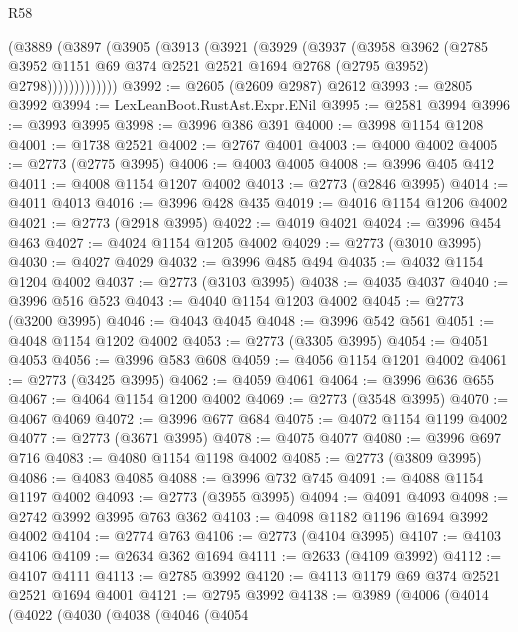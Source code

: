 \begin{lexlean}{R58}
\begin{coremodule}
            (@3889
              (@3897
                (@3905
                  (@3913
                    (@3921
                      (@3929
                        (@3937
                          (@3958
                            @3962
                            (@2785
                              @3952
                              @1151
                              @69
                              @374
                              @2521
                              @2521
                              @1694
                              @2768
                              (@2795 @3952)
                              @2798)))))))))))))
@3992 := @2605 (@2609 @2987) @2612
@3993 := @2805 @3992
@3994 := LexLeanBoot.RustAst.Expr.ENil
@3995 := @2581 @3994
@3996 := @3993 @3995
@3998 := @3996 @386 @391
@4000 := @3998 @1154 @1208
@4001 := @1738 @2521
@4002 := @2767 @4001
@4003 := @4000 @4002
@4005 := @2773 (@2775 @3995)
@4006 := @4003 @4005
@4008 := @3996 @405 @412
@4011 := @4008 @1154 @1207 @4002
@4013 := @2773 (@2846 @3995)
@4014 := @4011 @4013
@4016 := @3996 @428 @435
@4019 := @4016 @1154 @1206 @4002
@4021 := @2773 (@2918 @3995)
@4022 := @4019 @4021
@4024 := @3996 @454 @463
@4027 := @4024 @1154 @1205 @4002
@4029 := @2773 (@3010 @3995)
@4030 := @4027 @4029
@4032 := @3996 @485 @494
@4035 := @4032 @1154 @1204 @4002
@4037 := @2773 (@3103 @3995)
@4038 := @4035 @4037
@4040 := @3996 @516 @523
@4043 := @4040 @1154 @1203 @4002
@4045 := @2773 (@3200 @3995)
@4046 := @4043 @4045
@4048 := @3996 @542 @561
@4051 := @4048 @1154 @1202 @4002
@4053 := @2773 (@3305 @3995)
@4054 := @4051 @4053
@4056 := @3996 @583 @608
@4059 := @4056 @1154 @1201 @4002
@4061 := @2773 (@3425 @3995)
@4062 := @4059 @4061
@4064 := @3996 @636 @655
@4067 := @4064 @1154 @1200 @4002
@4069 := @2773 (@3548 @3995)
@4070 := @4067 @4069
@4072 := @3996 @677 @684
@4075 := @4072 @1154 @1199 @4002
@4077 := @2773 (@3671 @3995)
@4078 := @4075 @4077
@4080 := @3996 @697 @716
@4083 := @4080 @1154 @1198 @4002
@4085 := @2773 (@3809 @3995)
@4086 := @4083 @4085
@4088 := @3996 @732 @745
@4091 := @4088 @1154 @1197 @4002
@4093 := @2773 (@3955 @3995)
@4094 := @4091 @4093
@4098 := @2742 @3992 @3995 @763 @362
@4103 := @4098 @1182 @1196 @1694 @3992 @4002
@4104 := @2774 @763
@4106 := @2773 (@4104 @3995)
@4107 := @4103 @4106
@4109 := @2634 @362 @1694
@4111 := @2633 (@4109 @3992)
@4112 := @4107 @4111
@4113 := @2785 @3992
@4120 := @4113 @1179 @69 @374 @2521 @2521 @1694 @4001
@4121 := @2795 @3992
@4138 := @3989
    (@4006
      (@4014
        (@4022
          (@4030
            (@4038
              (@4046
                (@4054

\end{coremodule}
\end{lexlean}
